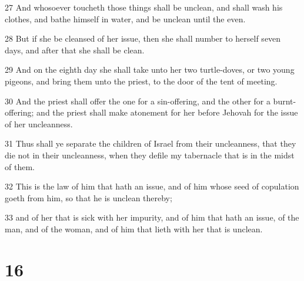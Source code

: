 \par 27 And whosoever toucheth those things shall be unclean, and shall wash his clothes, and bathe himself in water, and be unclean until the even.
\par 28 But if she be cleansed of her issue, then she shall number to herself seven days, and after that she shall be clean.
\par 29 And on the eighth day she shall take unto her two turtle-doves, or two young pigeons, and bring them unto the priest, to the door of the tent of meeting.
\par 30 And the priest shall offer the one for a sin-offering, and the other for a burnt-offering; and the priest shall make atonement for her before Jehovah for the issue of her uncleanness.
\par 31 Thus shall ye separate the children of Israel from their uncleanness, that they die not in their uncleanness, when they defile my tabernacle that is in the midst of them.
\par 32 This is the law of him that hath an issue, and of him whose seed of copulation goeth from him, so that he is unclean thereby;
\par 33 and of her that is sick with her impurity, and of him that hath an issue, of the man, and of the woman, and of him that lieth with her that is unclean.

\chapter{16}

